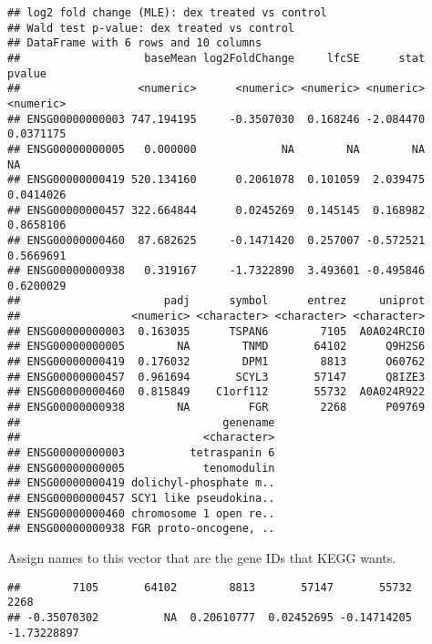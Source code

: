 \documentclass[
]{article}
\newenvironment{Shaded}{\begin{snugshade}}{\end{snugshade}}
\newcommand{\FunctionTok}[1]{\textcolor[rgb]{0.00,0.00,0.00}{#1}}
\newcommand{\NormalTok}[1]{#1}
\newcommand{\OtherTok}[1]{\textcolor[rgb]{0.56,0.35,0.01}{#1}}
\newcommand{\SpecialCharTok}[1]{\textcolor[rgb]{0.00,0.00,0.00}{#1}}
\begin{document}
\begin{verbatim}
## log2 fold change (MLE): dex treated vs control 
## Wald test p-value: dex treated vs control 
## DataFrame with 6 rows and 10 columns
##                   baseMean log2FoldChange     lfcSE      stat    pvalue
##                  <numeric>      <numeric> <numeric> <numeric> <numeric>
## ENSG00000000003 747.194195     -0.3507030  0.168246 -2.084470 0.0371175
## ENSG00000000005   0.000000             NA        NA        NA        NA
## ENSG00000000419 520.134160      0.2061078  0.101059  2.039475 0.0414026
## ENSG00000000457 322.664844      0.0245269  0.145145  0.168982 0.8658106
## ENSG00000000460  87.682625     -0.1471420  0.257007 -0.572521 0.5669691
## ENSG00000000938   0.319167     -1.7322890  3.493601 -0.495846 0.6200029
##                      padj      symbol      entrez     uniprot
##                 <numeric> <character> <character> <character>
## ENSG00000000003  0.163035      TSPAN6        7105  A0A024RCI0
## ENSG00000000005        NA        TNMD       64102      Q9H2S6
## ENSG00000000419  0.176032        DPM1        8813      O60762
## ENSG00000000457  0.961694       SCYL3       57147      Q8IZE3
## ENSG00000000460  0.815849    C1orf112       55732  A0A024R922
## ENSG00000000938        NA         FGR        2268      P09769
##                               genename
##                            <character>
## ENSG00000000003          tetraspanin 6
## ENSG00000000005            tenomodulin
## ENSG00000000419 dolichyl-phosphate m..
## ENSG00000000457 SCY1 like pseudokina..
## ENSG00000000460 chromosome 1 open re..
## ENSG00000000938 FGR proto-oncogene, ..
\end{verbatim}

Assign names to this vector that are the gene IDs that KEGG wants.

\begin{Shaded}
\end{Shaded}

\begin{verbatim}
##        7105       64102        8813       57147       55732        2268 
## -0.35070302          NA  0.20610777  0.02452695 -0.14714205 -1.73228897
\end{verbatim}
\end{document}
